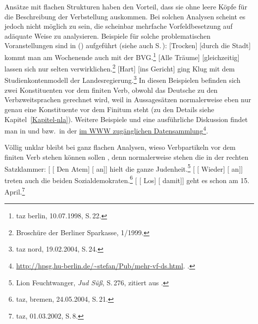 Ansätze mit flachen Strukturen haben den Vorteil, dass sie ohne leere Köpfe für die Beschreibung der
Verbstellung auskommen. Bei solchen Analysen scheint es jedoch nicht möglich zu sein, die scheinbar
mehrfache Vorfeldbesetzung \citep{Mueller2005d,MuellerGS} auf adäquate Weise zu analysieren. Beispiele für
solche problematischen Voranstellungen sind in () aufgeführt (siehe auch S.\,\pageref{bsp-mehr-vf}):
\eal
\label{bsp-smvfb}
\ex {}[Trocken] [durch die Stadt] kommt man am Wochenende auch mit der BVG.\footnote{
        taz berlin, 10.07.1998, S.\,22.
      }
\ex
\label{bsp-alle-traeume-gleichzeitig}
{}[Alle Träume] [gleichzeitig] lassen sich nur selten verwirklichen.\footnote{        
		Broschüre der Berliner Sparkasse, 1/1999.
        }
\ex {}[Hart] [ins Gericht] ging Klug mit dem Studienkontenmodell der Landesregierung.\footnote{
  taz nord, 19.02.2004, S.\,24.
  }
\zl
In diesen Beispielen befinden sich zwei Konstituenten vor dem finiten Verb, obwohl das Deutsche
zu den Verbzweitsprachen gerechnet wird, weil in Aussagesätzen
normalerweise eben nur genau eine Konstituente vor dem Finitum steht (zu den Details siehe Kapitel~\ref{Kapitel-nla}).
Weitere Beispiele und eine ausführliche Diskussion findet man in  und 
bzw.\ in der \href{http://hpsg.hu-berlin.de/~stefan/Pub/mehr-vf-ds.html}{im WWW zugänglichen Datensammlung}\footnote{
  \url{http://hpsg.hu-berlin.de/~stefan/Pub/mehr-vf-ds.html}. \mytoday.%
}.

Völlig unklar bleibt bei ganz flachen Analysen, wieso Verbpartikeln vor dem finiten Verb
stehen können sollen \citep[662--663]{MuellerGT-Eng5}, denn normalerweise stehen die in der rechten Satzklammer:
\eal
\label{ex-complex-vf}
\ex
{}[ [ Den Atem]  [ an]] hielt die ganze Judenheit.\footnote{%
Lion Feuchtwanger, \emph{Jud Süß}, S.\,276, zitiert aus .
}
\ex\label{bsp-wieder-an-tritt-vorn}
{}[ [ Wieder] [ an]] treten auch die beiden Sozialdemokraten.\footnote{%
  taz, bremen, 24.05.2004, S.\,21.
}
\ex\label{ex-los-damit}
{}[ [ Los]        [ damit]]    geht es schon   am 15. April.\footnote{%
        taz, 01.03.2002, S.\,8.%
    }%
\zl

